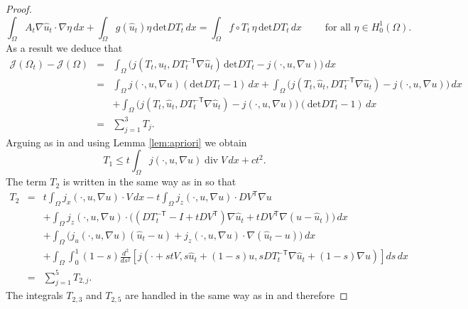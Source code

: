 \documentclass[10pt,a4paper]{amsart}
\DeclareMathOperator{\Div}{div}
\newcommand{\dx}{\,dx}
\begin{document}
\begin{proof}
\begin{equation} \label{stateuht}
\int_{\Omega} A_t \nabla \hat u_t \cdot \nabla \eta  \dx + \int_{\Omega} g(\hat u_t) \eta \, \mbox{det} D T_t \dx = \int_{\Omega} f \circ T_t \, \eta \, \mbox{det} D T_t  \dx \qquad
\mbox{ for all } \eta \in H^1_0(\Omega).
\end{equation}
As a result we deduce that
\begin{eqnarray}
\mathcal J(\Omega_t) - \mathcal J(\Omega) 
& = & \int_{\Omega} \bigl( j(T_t,\hat u_t, D T_t^{- \mathsf{T}} \nabla \hat u_t) \, \mbox{det} DT_t - j(\cdot,u,\nabla u) \bigr)  \dx   \nonumber \\
& = & \int_{\Omega} j(\cdot,u,\nabla u) (\mbox{det} DT_t -1 )  \dx + \int_{\Omega} \bigl( j(T_t,\hat u_t,DT_t^{- \mathsf{T}} \nabla \hat u_t) - j(\cdot,u,\nabla u) \bigr)  \dx    \nonumber  \\
& & +  \int_{\Omega} \bigl( j(T_t,\hat u_t, DT_t^{- \mathsf{T}} \nabla \hat u_t) -j(\cdot,u,\nabla u) \bigr) ( \mbox{det} DT_t - 1)  \dx  \nonumber \\
& = &  \sum_{j=1}^3 T_j.  \label{difj}
\end{eqnarray}
Arguing as in \cite[(3.7)]{DHH25-convergence} and using Lemma \ref{lem:apriori} we obtain
\begin{equation} \label{eq:t1}
T_1   \leq t \int_{\Omega} j(\cdot,u,\nabla u) \Div V  \dx + c t^2.
\end{equation} 
The term $T_2$ is written in the same way as in \cite[(3.8)]{DHH25-convergence} so that
\begin{eqnarray}
T_2 & = & t  \int_{\Omega} j_x(\cdot,u,\nabla u) \cdot V  \dx - t \int_{\Omega} j_z(\cdot,u,\nabla u) \cdot DV^{\mathsf{T}} \nabla u \nonumber \\
& & + \int_{\Omega} j_z(\cdot,u,\nabla u) \cdot \bigl( (DT_t^{-\mathsf{T}} -I + t DV^{\mathsf{T}} ) \nabla \hat u_t + t DV^{\mathsf{T}} \nabla (u - \hat u_t) \bigr)  \dx \nonumber \\
& & +  \int_{\Omega} \bigl( j_u(\cdot,u,\nabla u)(\hat u_t -u)  + j_z(\cdot,u,\nabla u) \cdot \nabla (\hat u_t - u) \bigr)  \dx \nonumber \\
& & + \int_{\Omega}  \int_0^1 (1-s) \frac{d^2}{ds^2} \left[ j(\cdot +stV,s \hat u_t +(1-s) u,
s  DT_t^{-\mathsf{T}} \nabla \hat u_t +(1-s) \nabla u) \right] ds  \dx \nonumber \\
& = & \sum_{j=1}^5 T_{2,j}. \label{t2}
\end{eqnarray}
The integrals $T_{2,3}$ and $T_{2,5}$ are handled in the same way as in \cite[(3.9), (3.17)]{DHH25-convergence} and therefore

\end{proof}
\end{document}
